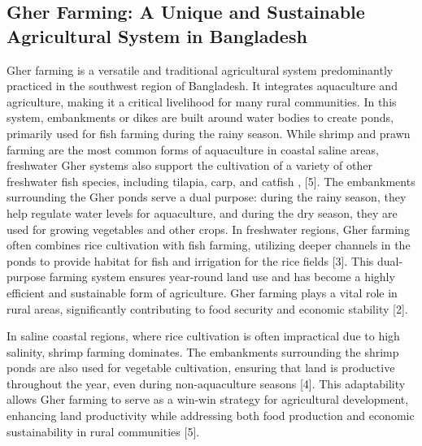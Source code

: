 \documentclass[conference]{IEEEtran}
\begin{document}
\subsection{\textbf{Gher Farming: A Unique and Sustainable Agricultural System in Bangladesh}}
Gher farming is a versatile and traditional agricultural system predominantly practiced in the southwest region of Bangladesh. It integrates aquaculture and agriculture, making it a critical livelihood for many rural communities. In this system, embankments or dikes are built around water bodies to create ponds, primarily used for fish farming during the rainy season. While shrimp and prawn farming are the most common forms of aquaculture in coastal saline areas, freshwater Gher systems also support the cultivation of a variety of other freshwater fish species, including tilapia, carp, and catfish \citep{1}, [5]. The embankments surrounding the Gher ponds serve a dual purpose: during the rainy season, they help regulate water levels for aquaculture, and during the dry season, they are used for growing vegetables and other crops. In freshwater regions, Gher farming often combines rice cultivation with fish farming, utilizing deeper channels in the ponds to provide habitat for fish and irrigation for the rice fields [3]. This dual-purpose farming system ensures year-round land use and has become a highly efficient and sustainable form of agriculture. Gher farming plays a vital role in rural areas, significantly contributing to food security and economic stability [2].

In saline coastal regions, where rice cultivation is often impractical due to high salinity, shrimp farming dominates. The embankments surrounding the shrimp ponds are also used for vegetable cultivation, ensuring that land is productive throughout the year, even during non-aquaculture seasons [4]. This adaptability allows Gher farming to serve as a win-win strategy for agricultural development, enhancing land productivity while addressing both food production and economic sustainability in rural communities [5].
\end{document}
